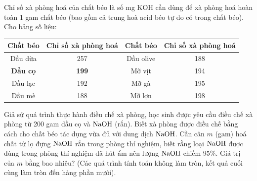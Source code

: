 \documentclass[11pt,a4paper]{article}
\begin{document}
\begin{ex}
Chỉ số xà phòng hoá của chất béo là số mg KOH cần dùng để xà phòng hoá hoàn toàn 1 gam chất béo (bao gồm cả trung hoà acid béo tự do có trong chất béo). Cho bảng số liệu:
\begin{center}
\renewcommand{\arraystretch}{1.15}
\begin{tabular}{|c|c|c|c|}
\hline
\rowcolor{tableGreen}
\textbf{Chất béo} & \textbf{Chỉ số xà phòng hoá} & \textbf{Chất béo} & \textbf{Chỉ số xà phòng hoá} \\
\hline
Dầu dừa & 257 & Dầu olive & 188 \\
\hline
\textbf{Dầu cọ} & \textbf{199} & Mỡ vịt & 194 \\
\hline
Dầu lạc & 192 & Mỡ gà & 195 \\
\hline
Dầu mè & 188 & Mỡ lợn & 198 \\
\hline
\end{tabular}
\end{center}
Giả sử quá trình thực hành điều chế xà phòng, học sinh được yêu cầu điều chế xà phòng từ 200 gam dầu cọ và $\ce{NaOH}$ (rắn). Biết xà phòng được điều chế bằng cách cho chất béo tác dụng vừa đủ với dung dịch $\ce{NaOH}$. Cần cân $m$ (gam) hoá chất từ lọ đựng $\ce{NaOH}$ rắn trong phòng thí nghiệm, biết rằng loại $\ce{NaOH}$ được dùng trong phòng thí nghiệm đã hút ẩm nên lượng $\ce{NaOH}$ chiếm 95\%. Giá trị của $m$ bằng bao nhiêu? (Các quá trình tính toán không làm tròn, kết quả cuối cùng làm tròn đến hàng phần mười).

\end{ex}
\end{document}
